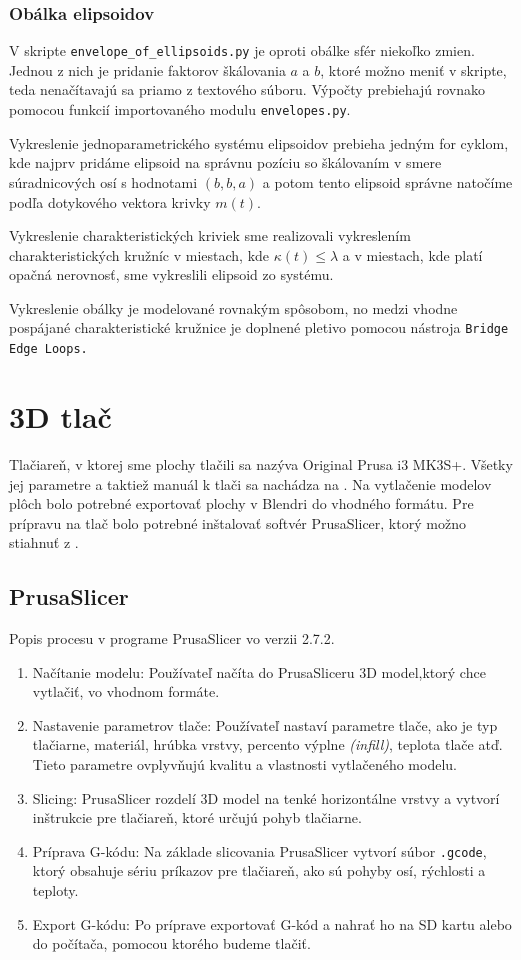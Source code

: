 \subsubsection*{Obálka elipsoidov}
V skripte \verb|envelope_of_ellipsoids.py| je oproti obálke sfér niekoľko zmien. Jednou z nich je pridanie faktorov škálovania $a$ a $b$, ktoré možno meniť v skripte, teda nenačítavajú sa priamo z textového súboru. Výpočty prebiehajú rovnako pomocou funkcií importovaného modulu \verb|envelopes.py|.

Vykreslenie jednoparametrického systému elipsoidov prebieha jedným for cyklom, kde najprv pridáme elipsoid na správnu pozíciu so škálovaním v smere súradnicových osí s hodnotami $(b, b, a)$ a potom tento elipsoid správne natočíme podľa dotykového vektora krivky $m(t).$  

Vykreslenie charakteristických kriviek sme realizovali vykreslením charakteristických kružníc v miestach, kde
$\kappa(t) \leq \lambda$ a v miestach, kde platí opačná nerovnosť, sme vykreslili elipsoid zo systému.

Vykreslenie obálky je modelované rovnakým spôsobom, no medzi vhodne pospájané charakteristické kružnice je doplnené pletivo pomocou nástroja \verb|Bridge Edge Loops.| 

\section{3D tlač}
Tlačiareň, v ktorej sme plochy tlačili sa nazýva Original Prusa i3 MK3S+. Všetky jej parametre a taktiež manuál k tlači sa nachádza na \cite{PrusaManual}. Na vytlačenie modelov plôch bolo potrebné exportovať plochy v Blendri do vhodného formátu. Pre prípravu na tlač bolo potrebné inštalovať softvér PrusaSlicer, ktorý možno stiahnuť z \cite{PrusaSlicer}.
\subsection{PrusaSlicer}
Popis procesu v programe PrusaSlicer vo verzii 2.7.2.
\begin{enumerate}
\item Načítanie modelu: Používateľ načíta do PrusaSliceru 3D model,ktorý chce vytlačiť, vo vhodnom formáte.

\item Nastavenie parametrov tlače: Používateľ nastaví parametre tlače, ako je typ tlačiarne, materiál, hrúbka vrstvy, percento výplne \textit{(infill)}, teplota tlače atď. Tieto parametre ovplyvňujú kvalitu a vlastnosti vytlačeného modelu.

\item Slicing: PrusaSlicer rozdelí 3D model na tenké horizontálne vrstvy a vytvorí inštrukcie pre tlačiareň, ktoré určujú pohyb tlačiarne. 

\item Príprava G-kódu: Na základe slicovania PrusaSlicer vytvorí súbor \verb|.gcode|, ktorý obsahuje sériu príkazov pre tlačiareň, ako sú pohyby osí, rýchlosti a teploty.

\item Export G-kódu: Po príprave exportovať G-kód a nahrať ho na SD kartu alebo do počítača, pomocou ktorého budeme tlačiť.
\end{enumerate}

